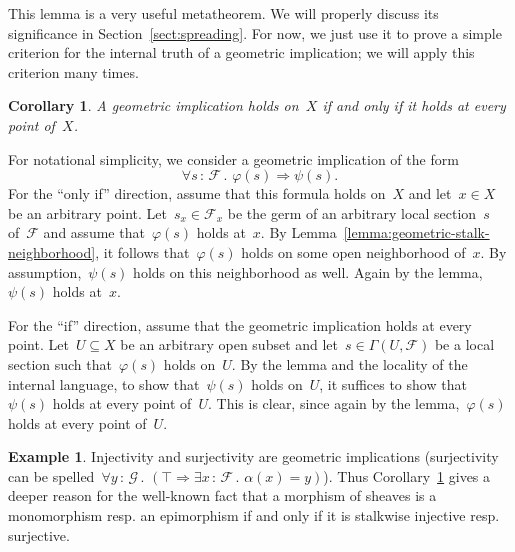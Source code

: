 \documentclass[10pt,reqno,a4paper]{amsbook}
\makeatletter
\theoremstyle{definition}
\newtheorem{ex}[defn]{Example}
\theoremstyle{plain}
\newtheorem{cor}[defn]{Corollary}
\theoremstyle{remark}
\newcommand{\F}{\mathcal{F}}
\newcommand{\G}{\mathcal{G}}
\newcommand{\?}{\,{:}\,}
\renewcommand{\_}{\mathpunct{.}\,}
\newcommand{\resp}{resp.\@\xspace}
\renewenvironment{proof}[1][\proofname]{\par
  \pushQED{\qed}%
  \normalfont \topsep6\p@\@plus6\p@\relax
  \trivlist
  \item[\hskip\labelsep
        \itshape
    #1\@addpunct{.}]\ignorespaces
}{%
  \popQED\endtrivlist\@endpefalse
}
\makeatother
\begin{document}
This lemma is a very useful metatheorem. We will properly discuss its
significance in Section~\ref{sect:spreading}. For now, we just use it to prove a
simple criterion for the internal truth of a geometric implication; we will
apply this criterion many times.

\begin{cor}\label{cor:geometric-implication}
A geometric implication holds on~$X$ if and only if it holds at
every point of~$X$.\end{cor}
\begin{proof}For notational simplicity, we consider a geometric implication of
the form
\[ \forall s\?\F\_ \varphi(s) \Rightarrow \psi(s). \]
For the ``only if'' direction, assume that this formula holds on~$X$ and let~$x
\in X$ be an arbitrary point. Let~$s_x \in \F_x$ be the germ of an arbitrary
local section~$s$ of~$\F$ and assume that~$\varphi(s)$ holds at~$x$. By
Lemma~\ref{lemma:geometric-stalk-neighborhood}, it follows that~$\varphi(s)$ holds on some open neighborhood of~$x$. By
assumption,~$\psi(s)$ holds on this neighborhood as well. Again by the
lemma,~$\psi(s)$ holds at~$x$.

For the ``if'' direction, assume that the geometric implication holds at every
point. Let~$U \subseteq X$ be an arbitrary open subset and let~$s \in
\Gamma(U,\F)$ be a local section such that~$\varphi(s)$ holds on~$U$. By the
lemma and the locality of the internal language, to show that~$\psi(s)$ holds
on~$U$, it suffices to show that~$\psi(s)$
holds at every point of~$U$. This is clear, since again by the
lemma,~$\varphi(s)$ holds at every point of~$U$.
\end{proof}

\begin{ex}Injectivity and surjectivity are geometric implications (surjectivity
can be spelled~$\forall y\?\G\_ (\top \Rightarrow \exists x\?\F\_ \alpha(x) =
y)$). Thus Corollary~\ref{cor:geometric-implication} gives a deeper reason for the well-known fact that a
morphism of sheaves is a monomorphism \resp an epimorphism if and only if it is
stalkwise injective \resp surjective.\end{ex}
\end{document}
